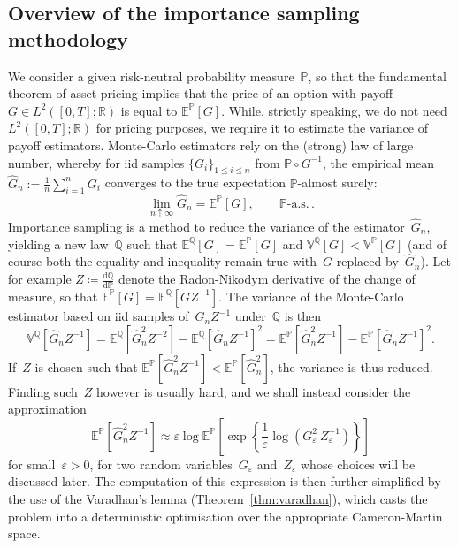 \documentclass{amsart}[11pt]
\numberwithin{equation}{section}
\numberwithin{theorem}{subsection}
\numberwithin{proposition}{subsection}
\numberwithin{definition}{subsection}
\numberwithin{lemma}{subsection}
\numberwithin{assumption}{subsection}
\newcommand{\PP}{\mathbb{P}}
\newcommand{\QQ}{\mathbb{Q}}
\newcommand{\RR}{\mathbb{R}}
\newcommand{\EE}{\mathbb{E}}
\newcommand{\VV}{\mathbb{V}}
\newcommand{\D}{\mathrm{d}}
\newcommand{\eps}{\varepsilon}
\begin{document}
\subsection{Overview of the importance sampling methodology}
We consider a given risk-neutral probability measure~$\PP$, so that
the fundamental theorem of asset pricing
implies that the price of an option with payoff $G\in L^2([0,T];\RR)$ is equal to $\EE^{\PP}[G]$. 
While, strictly speaking, 
we do not need $L^2([0,T];\RR)$ for pricing purposes, we require it to estimate the variance of payoff estimators.
Monte-Carlo estimators rely on the (strong) law of large number, whereby for iid samples $\{G_{i}\}_{1\leq i \leq n}$ from $\PP \circ G^{-1}$, 
the empirical mean $\widehat{G}_n :=\frac{1}{n}\sum_{i=1}^{n}G_i$
converges to the true expectation $\PP$-almost surely:
$$
\lim_{n\uparrow \infty}\widehat{G}_n = \EE^{\PP}[G],
\qquad\PP\text{-a.s.}\,.
$$
Importance sampling is a method to reduce the variance of the estimator~$\widehat{G}_n$, yielding a new law~$\QQ$ such that $\EE^{\QQ}[G] = \EE^{\PP}[G]$
and $\VV^{\QQ}[G] < \VV^{\PP}[G]$
(and of course both the equality and inequality remain true with~$G$ replaced by~$\widehat{G}_n$).
Let for example $Z \coloneqq \frac{\D\QQ}{\D\PP}$ denote the Radon-Nikodym derivative of the change of measure, so that
$\EE^{\PP}[G] = \EE^{\QQ}[G Z^{-1}]$.								 
The variance of the Monte-Carlo estimator based on iid samples of~$\widehat{G}_n Z^{-1}$ under~$\QQ$ is then
$$
\VV^{\QQ}\left[\widehat{G}_n Z^{-1}\right] 
 = \EE^{\QQ}\left[\widehat{G}_n^2 Z^{-2}\right]  - \EE^{\QQ}\left[\widehat{G}_n Z^{-1}\right]^2
 = \EE^{\PP}\left[\widehat{G}_n^2 Z^{-1}\right]  - \EE^{\PP}\left[\widehat{G}_n Z^{-1}\right]^2.
$$
If~$Z$ is chosen such that $\EE^{\PP}[\widehat{G}_n^2 Z^{-1}] < \EE^{\PP}[\widehat{G}_n^2]$, 
the variance is thus reduced.
Finding such~$Z$ however is usually hard, and  
we shall instead consider the approximation
\begin{equation}\label{eq:proxy}
\EE^{\PP}\left[\widehat{G}_n^2 Z^{-1}\right]
\approx \eps\log \EE^{\PP}\left[\exp\left\{\frac{1}{\eps}\log(G_{\eps}^2 \ Z_{\eps}^{-1})\right\}\right] 
\end{equation}
for small~$\eps>0$, for two random variables~$G_{\eps}$ and~$Z_{\eps}$ whose choices will be discussed later.
The computation of this expression is then further simplified by the use of the Varadhan's lemma (Theorem~\ref{thm:varadhan}), which casts the problem into a deterministic optimisation over the appropriate Cameron-Martin space.
\end{document}
